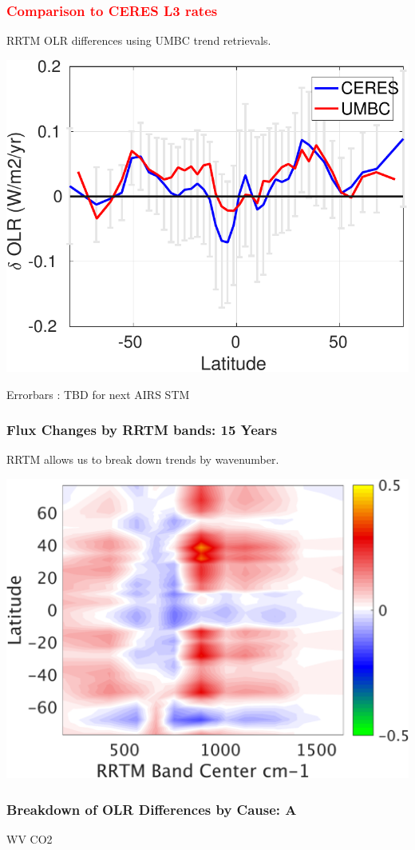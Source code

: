 \documentclass[10pt,t]{beamer}
\begin{document}
\begin{frame}
  \frametitle{\textcolor{red}{\bf Comparison to CERES L3 rates}}
  RRTM OLR differences using UMBC trend retrievals.
  \begin{center}
    \noindent\includegraphics[width=0.725\linewidth]{Figs/umbc_vs_ceres_fluxrates.pdf}
  \end{center}
 Errorbars : TBD for next AIRS STM
\end{frame}

\begin{frame}
  \frametitle{Flux Changes by RRTM bands: 15 Years}
  RRTM allows us to break down trends by wavenumber.\newline 
  \begin{center}
    \noindent\includegraphics[width=0.625\linewidth]{Figs/umbc_vs_band_fluxrates.png}
  \end{center}
\end{frame}

\begin{frame}
  \frametitle{Breakdown of OLR Differences by Cause: A}

  \hspace{0.50in} WV  \hspace{1.5in} CO2 \\
  \begin{center}
  \end{center}
\end{frame}
\end{document}
